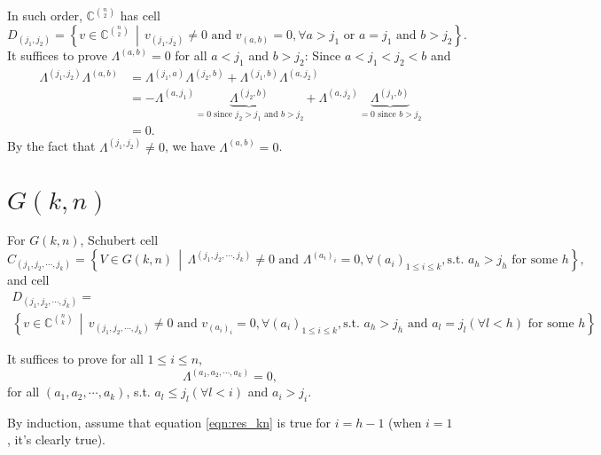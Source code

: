 \documentclass[11pt]{homework}
\begin{document}
In such order, $\mathbb{C}^{\binom{n}{2}}$ has cell
\begin{equation*}
    D_{(j_1,j_2)} = \left\{ v \in \mathbb{C}^{\binom{n}{2}} \, \middle | \, v_{(j_1,j_2)} \neq 0 \text{ and } v_{(a,b)} = 0, \forall a > j_1 \text{ or } a = j_1 \text{ and } b > j_2 \right\}.
\end{equation*}
It suffices to prove $\Lambda^{(a,b)}=0$ for all $a < j_1$ and $b > j_2$:
Since $a < j_1 < j_2 < b$ and 
\begin{align*}
    \Lambda^{(j_1,j_2)} \Lambda^{(a,b)} &= \Lambda^{(j_1,a)} \Lambda^{(j_2,b)} + \Lambda^{(j_1,b)} \Lambda^{(a,j_2)} \\
    &= - \Lambda^{(a,j_1)} \underbrace{\Lambda^{(j_2,b)}}_{=0 \text{ since } j_2 > j_1 \text{ and } b> j_2} + \Lambda^{(a,j_2)} \underbrace{\Lambda^{(j_1,b)}}_{=0 \text{ since } b> j_2} \\
    &= 0.
\end{align*}
By the fact that $\Lambda^{(j_1,j_2)} \neq 0$, we have $\Lambda^{(a,b)}=0$.


\section{$G(k,n)$}
For $G(k,n)$, Schubert cell 
\begin{equation*}
    C_{(j_1,j_2, \cdots, j_k)} = \left\{V \in G(k, n) \, \middle | \, \Lambda^{(j_1,j_2, \cdots, j_k)} \neq 0 \text{ and } \Lambda^{(a_i)_{i}}=0, \forall (a_i)_{1 \leq i \leq k}, \text{s.t. } a_h > j_h \text{ for some } h \right\},
\end{equation*}
and cell
\begin{multline*}
    D_{(j_1,j_2, \cdots, j_k)} = \\ \left\{ v \in \mathbb{C}^{\binom{n}{k}} \, \middle | \, v_{(j_1,j_2, \cdots, j_k)} \neq 0 \text{ and } v_{(a_i)_{i}} = 0, \forall (a_i)_{1 \leq i \leq k}, \text{s.t. } a_h > j_h \text{ and } a_l = j_l (\forall l < h) \text{ for some } h \right\}.
\end{multline*}

It suffices to prove for all $1 \leq i \leq n$,
\begin{equation}
    \label{eqn:res_kn}
    \Lambda^{(a_1, a_2, \cdots, a_k)} = 0,
\end{equation}
for all $(a_1, a_2, \cdots, a_k)$, s.t. $a_l \leq j_l (\forall l < i)$ and $a_i > j_i$.

By induction, assume that equation \ref{eqn:res_kn} is true for $i = h - 1$  (when $i = 1$, it's clearly true).
\end{document}
